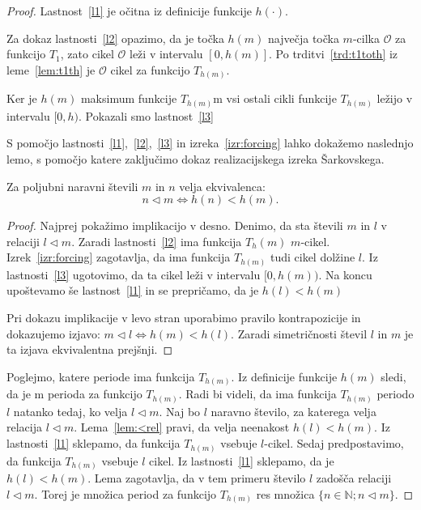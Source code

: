 \documentclass[mat2]{fmfdelo}
\newcommand{\N}{\mathbb N}
\begin{document}
\begin{proof}
Lastnost~\ref{l1} je očitna iz definicije funkcije $h(\cdot)$.

Za dokaz lastnosti~\ref{l2} opazimo, da je točka $h(m)$ največja točka $m$-cilka $\mathcal{O}$ za funkcijo $T_1$, zato cikel $\mathcal{O}$ leži v intervalu $[0, h(m)]$. Po trditvi~\ref{trd:t1toth} iz leme~\ref{lem:t1th} je $\mathcal{O}$ cikel za funkcijo $T_{h(m)}$. 

Ker je $h(m)$ maksimum funkcije $T_{h(m)}$m vsi ostali cikli funkcije $T_{h(m)}$ ležijo v intervalu $[0, h)$. Pokazali smo lastnost~\ref{l3}

S pomočjo lastnosti~\ref{l1},~\ref{l2},~\ref{l3} in izreka~\ref{izr:forcing} lahko dokažemo naslednjo lemo, s pomočjo katere zaključimo dokaz realizacijskega izreka Šarkovskega.

\begin{lema}\label{lem:<rel}
Za poljubni naravni števili $m$ in $n$ velja ekvivalenca:
$$ n \triangleleft m \iff h(n) < h(m).$$
\end{lema}
\begin{proof}
Najprej pokažimo implikacijo v desno. Denimo, da sta števili $m$ in $l$ v relaciji $l \triangleleft m$. Zaradi lastnosti~\ref{l2} ima funkcija $T_h(m)$ $m$-cikel. Izrek~\ref{izr:forcing} zagotavlja, da ima funkcija $T_{h(m)}$ tudi cikel dolžine $l$. Iz lastnosti~\ref{l3} ugotovimo, da ta cikel leži v intervalu $[0, h(m))$. Na koncu upoštevamo še lastnost~\ref{l1} in se prepričamo, da je $h(l) < h(m)$

Pri dokazu implikacije v levo stran uporabimo pravilo kontrapozicije in dokazujemo izjavo: $ m \triangleleft l \iff h(m) < h(l)$. Zaradi simetričnosti števil $l$ in $m$ je ta izjava ekvivalentna prejšnji.
\end{proof}
Poglejmo, katere periode ima funkcija $T_{h(m)}$. Iz definicije funkcije $h(m)$ sledi, da je m perioda za funkcijo $T_{h(m)}$. Radi bi videli, da ima funkcija $T_{h(m)}$ periodo $l$ natanko tedaj, ko velja $l \triangleleft m$. Naj bo $l$ naravno število, za katerega velja relacija $l \triangleleft m$. Lema~\ref{lem:<rel} pravi, da velja neenakost $h(l) < h(m)$. Iz lastnosti~\ref{l1} sklepamo, da funkcija $T_{h(m)}$ vsebuje $l$-cikel. Sedaj predpostavimo, da funkcija $T_{h(m)}$ vsebuje $l$ cikel. Iz lastnosti~\ref{l1} sklepamo, da je $h(l) < h(m)$. Lema zagotavlja, da v tem primeru število $l$ zadošča relaciji $l \triangleleft m$. Torej je množica period za funkcijo $T_{h(m)}$ res množica $\{n \in \N; n \triangleleft m\}$.


\end{proof}
\end{document}
